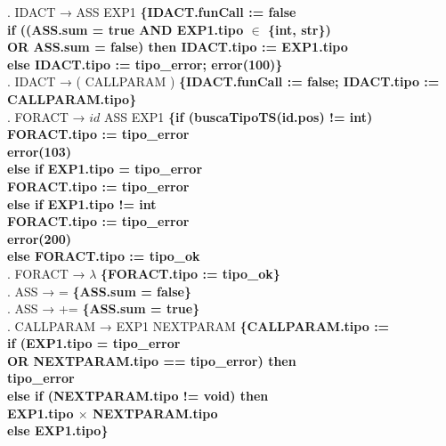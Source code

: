 \begin{tabbing}
    . IDACT → ASS EXP1 \textbf{\{IDACT.funCall := false}\\
    \>              \> \textbf{if ((ASS.sum = true AND EXP1.tipo $\in$ \{int, str\})}\\
    \>              \>          \>\textbf{OR ASS.sum = false) then IDACT.tipo := EXP1.tipo}\\
    \>              \> \textbf{else IDACT.tipo := tipo\_error; error(100)\}}\\
    . IDACT → ( CALLPARAM ) \textbf{\{IDACT.funCall := false; IDACT.tipo := CALLPARAM.tipo\}}\\
    . FORACT → $id$ ASS EXP1 \textbf{\{if (buscaTipoTS(id.pos) != int)}\\
    \>              \>          \> \textbf{FORACT.tipo := tipo\_error}\\
    \>              \>          \> \textbf{error(103)}\\
    \>              \> \textbf{else if EXP1.tipo = tipo\_error}\\
    \>              \>          \> \textbf{FORACT.tipo := tipo\_error}\\
    \>              \> \textbf{else if EXP1.tipo != int} \\
    \>              \>          \> \textbf{FORACT.tipo := tipo\_error}\\
    \>              \>          \> \textbf{error(200)}\\
    \>              \> \textbf{else FORACT.tipo := tipo\_ok}\\
    . FORACT → $\lambda$ \textbf{\{FORACT.tipo := tipo\_ok\}}\\
    . ASS → = \textbf{\{ASS.sum = false\}}\\
    . ASS → += \textbf{\{ASS.sum = true\}}\\
    . CALLPARAM → EXP1 NEXTPARAM \textbf{\{CALLPARAM.tipo :=}\\
    \>              \> \textbf{if (EXP1.tipo = tipo\_error}\\
    \>              \> \textbf{OR NEXTPARAM.tipo == tipo\_error) then}\\
    \>              \>          \> \textbf{tipo\_error}\\
    \>              \> \textbf{else if (NEXTPARAM.tipo != void) then}\\
    \>              \>          \>\textbf{EXP1.tipo $\times$ NEXTPARAM.tipo}\\
    \>              \> \textbf{else EXP1.tipo\}}\\

\end{tabbing}
